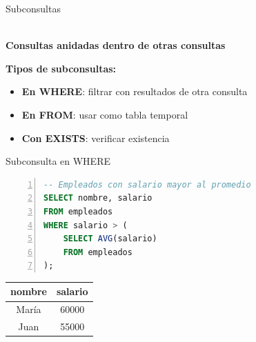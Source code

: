 \documentclass{beamer}
\begin{document}
\begin{frame}{Subconsultas}
    \begin{center}
        {\Large \faCode}\\[0.2cm]
        \textbf{Consultas anidadas dentro de otras consultas}
    \end{center}
    
    \vspace{0.3cm}
    
    \textbf{Tipos de subconsultas:}
    \begin{itemize}
        \item[{\makebox[1em][c]{\textcolor{black}{\faFilter}}}] \textbf{En WHERE}: filtrar con resultados de otra consulta
        \item[{\makebox[1em][c]{\textcolor{black}{\faTable}}}] \textbf{En FROM}: usar como tabla temporal
        \item[{\makebox[1em][c]{\textcolor{black}{\faCheck}}}] \textbf{Con EXISTS}: verificar existencia
    \end{itemize}
\end{frame}

\begin{frame}[fragile]{Subconsulta en WHERE}
    \begin{lstlisting}[language=SQL, numbers=left, numbersep=5pt]
-- Empleados con salario mayor al promedio
SELECT nombre, salario
FROM empleados
WHERE salario > (
    SELECT AVG(salario)
    FROM empleados
);
    \end{lstlisting}
    
    \vspace{0.3cm}
    
    \begin{center}
        \begin{tabular}{cc}
            \toprule
            nombre & salario \\
            \midrule
            María & 60000 \\
            Juan & 55000 \\
            \bottomrule
        \end{tabular}
    \end{center}
\end{frame}
\end{document}
